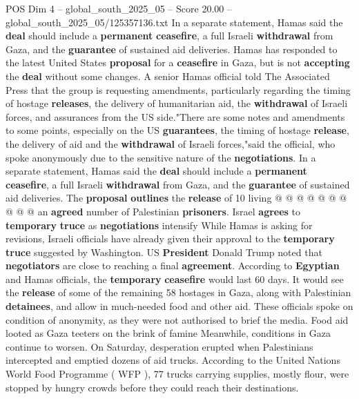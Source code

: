 \begin{textsample}{POS Dim 4 – global\_south\_2025\_05 – Score 20.00 – global\_south\_2025\_05/125357136.txt}  \label{ex:f4_pos_098}
In a separate statement, Hamas said the \textbf{deal} should include a \textbf{permanent} \textbf{ceasefire}, a full Israeli \textbf{withdrawal} from Gaza, and the \textbf{guarantee} of sustained aid deliveries.
Hamas has responded to the latest United States \textbf{proposal} for a \textbf{ceasefire} in Gaza, but is not \textbf{accepting} the \textbf{deal} without some changes.
A senior Hamas official told The Associated Press that the group is requesting amendments, particularly regarding the timing of hostage \textbf{releases}, the delivery of humanitarian aid, the \textbf{withdrawal} of Israeli forces, and assurances from the US side."There are some notes and amendments to some points, especially on the US \textbf{guarantees}, the timing of hostage \textbf{release}, the delivery of aid and the \textbf{withdrawal} of Israeli forces,"said the official, who spoke anonymously due to the sensitive nature of the \textbf{negotiations}.
In a separate statement, Hamas said the \textbf{deal} should include a \textbf{permanent} \textbf{ceasefire}, a full Israeli \textbf{withdrawal} from Gaza, and the \textbf{guarantee} of sustained aid deliveries.
The \textbf{proposal} \textbf{outlines} the \textbf{release} of 10 living @ @ @ @ @ @ @ @ @ @ an \textbf{agreed} number of Palestinian \textbf{prisoners}.
Israel \textbf{agrees} to \textbf{temporary} \textbf{truce} as \textbf{negotiations} intensify While Hamas is asking for revisions, Israeli officials have already given their approval to the \textbf{temporary} \textbf{truce} suggested by Washington.
US \textbf{President} Donald Trump noted that \textbf{negotiators} are close to reaching a final \textbf{agreement}.
According to \textbf{Egyptian} and Hamas officials, the \textbf{temporary} \textbf{ceasefire} would last 60 days.
It would see the \textbf{release} of some of the remaining 58 hostages in Gaza, along with Palestinian \textbf{detainees}, and allow in much-needed food and other aid.
These officials spoke on condition of anonymity, as they were not authorised to brief the media.
Food aid looted as Gaza teeters on the brink of famine Meanwhile, conditions in Gaza continue to worsen.
On Saturday, desperation erupted when Palestinians intercepted and emptied dozens of aid trucks.
According to the United Nations World Food Programme ( WFP ), 77 trucks carrying supplies, mostly flour, were stopped by hungry crowds before they could reach their destinations.

\end{textsample}
